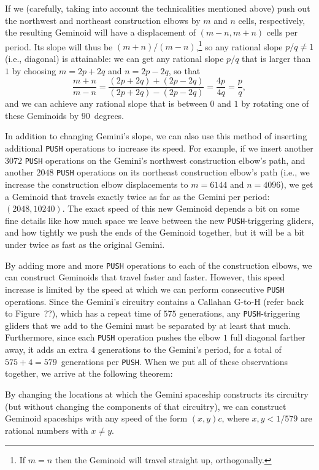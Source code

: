 If we (carefully, taking into account the technicalities mentioned above) push out the northwest and northeast construction elbows by $m$ and $n$ cells, respectively, the resulting Geminoid will have a displacement of $(m-n,m+n)$ cells per period. Its slope will thus be $(m+n)/(m-n)$,\footnote{If $m = n$ then the Geminoid will travel straight up, orthogonally.} so any rational slope $p/q \neq 1$ (i.e., diagonal) is attainable: we can get any rational slope $p/q$ that is larger than $1$ by choosing $m = 2p+2q$ and $n = 2p-2q$, so that
\[
	\frac{m+n}{m-n} = \frac{(2p+2q)+(2p-2q)}{(2p+2q)-(2p-2q)} = \frac{4p}{4q} = \frac{p}{q},
\]
and we can achieve any rational slope that is between $0$ and $1$ by rotating one of these Geminoids by $90$~degrees.

In addition to changing Gemini's slope, we can also use this method of inserting additional \texttt{PUSH} operations to increase its speed. For example, if we insert another $3072$ \texttt{PUSH} operations on the Gemini's northwest construction elbow's path, and another $2048$ \texttt{PUSH} operations on its northeast construction elbow's path (i.e., we increase the construction elbow displacements to $m = 6144$ and $n = 4096$), we get a Geminoid that travels exactly twice as far as the Gemini per period: $(2048,10240)$. The exact speed of this new Geminoid depends a bit on some fine details like how much space we leave between the new \texttt{PUSH}-triggering gliders, and how tightly we push the ends of the Geminoid together, but it will be a bit under twice as fast as the original Gemini.

By adding more and more \texttt{PUSH} operations to each of the construction elbows, we can construct Geminoids that travel faster and faster. However, this speed increase is limited by the speed at which we can perform consecutive \texttt{PUSH} operations. Since the Gemini's circuitry contains a Callahan G-to-H (refer back to Figure~??), which has a repeat time of $575$ generations, any \texttt{PUSH}-triggering gliders that we add to the Gemini must be separated by at least that much. Furthermore, since each \texttt{PUSH} operation pushes the elbow $1$ full diagonal farther away, it adds an extra $4$ generations to the Gemini's period, for a total of $575+4 = 579$~generations per \texttt{PUSH}. When we put all of these observations together, we arrive at the following theorem:

\begin{theorem}\label{thm:geminoid_speed_limit}
	By changing the locations at which the Gemini spaceship constructs its circuitry (but without changing the components of that circuitry), we can construct Geminoid spaceships with any speed of the form $(x,y)c$, where $x, y < 1/579$ are rational numbers with $x \neq y$.
\end{theorem}

